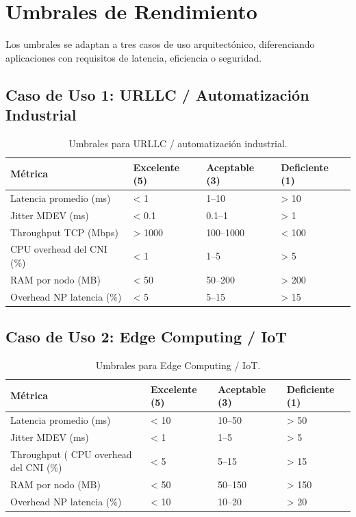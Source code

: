 \documentclass[12pt,a4paper]{article}
\begin{document}
\section{Umbrales de Rendimiento}

Los umbrales se adaptan a tres casos de uso arquitectónico, diferenciando aplicaciones con requisitos de latencia, eficiencia o seguridad.

\subsection{Caso de Uso 1: URLLC / Automatización Industrial}

\begin{table}[htbp]
\centering
\caption{Umbrales para URLLC / automatización industrial.}
\label{tab:umbrales-urllc}
\begin{tabular}{p{3.5cm}p{3.5cm}p{3.5cm}p{3cm}}
\toprule
\textbf{Métrica} & \textbf{Excelente (5)} & \textbf{Aceptable (3)} & \textbf{Deficiente (1)} \\
\midrule
Latencia promedio (ms) & < 1 & 1--10 & > 10 \\
Jitter MDEV (ms) & < 0.1 & 0.1--1 & > 1 \\
Throughput TCP (Mbps) & > 1000 & 100--1000 & < 100 \\
CPU overhead del CNI (\%) & < 1 & 1--5 & > 5 \\
RAM por nodo (MB) & < 50 & 50--200 & > 200 \\
Overhead NP latencia (\%) & < 5 & 5--15 & > 15 \\
\bottomrule
\end{tabular}
\end{table}

\subsection{Caso de Uso 2: Edge Computing / IoT}

\begin{table}[htbp]
\centering
\caption{Umbrales para Edge Computing / IoT.}
\label{tab:umbrales-edge}
\begin{tabular}{p{3.5cm}p{3.5cm}p{3.5cm}p{3cm}}
\toprule
\textbf{Métrica} & \textbf{Excelente (5)} & \textbf{Aceptable (3)} & \textbf{Deficiente (1)} \\
\midrule
Latencia promedio (ms) & < 10 & 10--50 & > 50 \\
Jitter MDEV (ms) & < 1 & 1--5 & > 5 \\
Throughput (%
CPU overhead del CNI (\%) & < 5 & 5--15 & > 15 \\
RAM por nodo (MB) & < 50 & 50--150 & > 150 \\
Overhead NP latencia (\%) & < 10 & 10--20 & > 20 \\
\bottomrule
\end{tabular}
\end{table}
\end{document}
